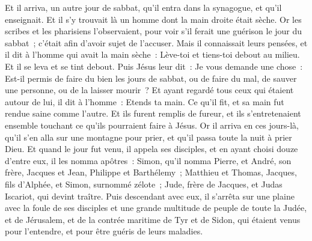 \begin{multicols}{2}
Et il arriva, un autre jour de sabbat, qu'il entra dans la synagogue, et qu'il enseignait. Et il s'y trouvait là un homme dont la main droite était sèche.
Or les scribes et les pharisiens l'observaient, pour voir s'il ferait une guérison le jour du sabbat~; c'était afin d'avoir sujet de l'accuser.
Mais il connaissait leurs pensées, et il dit à l'homme qui avait la main sèche~: Lève-toi et tiens-toi debout au milieu. Et il se leva et se tint debout.
Puis Jésus leur dit~: Je vous demande une chose~: Est-il permis de faire du bien les jours de sabbat, ou de faire du mal, de sauver une personne, ou de la laisser mourir~?
Et ayant regardé tous ceux qui étaient autour de lui, il dit à l'homme~: Etends ta main. Ce qu'il fit, et sa main fut rendue saine comme l'autre.
Et ils furent remplis de fureur, et ils s'entretenaient ensemble touchant ce qu'ils pourraient faire à Jésus.
Or il arriva en ces jours-là, qu'il s'en alla sur une montagne pour prier, et qu'il passa toute la nuit à prier Dieu.
Et quand le jour fut venu, il appela ses disciples, et en ayant choisi douze d'entre eux, il les nomma apôtres~:
Simon, qu'il nomma Pierre, et André, son frère, Jacques et Jean, Philippe et Barthélemy~;
Matthieu et Thomas, Jacques, fils d'Alphée, et Simon, surnommé zélote~;
Jude, frère de Jacques, et Judas Iscariot, qui devint traître.
Puis descendant avec eux, il s'arrêta sur une plaine avec la foule de ses disciples et une grande multitude de peuple de toute la Judée, et de Jérusalem, et de la contrée maritime de Tyr et de Sidon, qui étaient venus pour l'entendre, et pour être guéris de leurs maladies.

\end{multicols}
